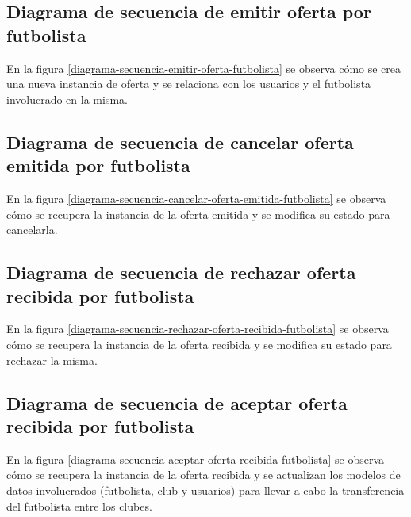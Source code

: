 \subsection*{Diagrama de secuencia de emitir oferta por futbolista}
En la figura \ref{diagrama-secuencia-emitir-oferta-futbolista} se observa cómo
se crea una nueva instancia de oferta y se relaciona con los usuarios y el
futbolista involucrado en la misma.


\subsection*{Diagrama de secuencia de cancelar oferta emitida por futbolista}
En la figura \ref{diagrama-secuencia-cancelar-oferta-emitida-futbolista} se
observa cómo se recupera la instancia de la oferta emitida y se modifica su
estado para cancelarla.


\subsection*{Diagrama de secuencia de rechazar oferta recibida por futbolista}
En la figura \ref{diagrama-secuencia-rechazar-oferta-recibida-futbolista} se
observa cómo se recupera la instancia de la oferta recibida y se modifica su
estado para rechazar la misma.


\newpage

\subsection*{Diagrama de secuencia de aceptar oferta recibida por futbolista}
En la figura \ref{diagrama-secuencia-aceptar-oferta-recibida-futbolista} se
observa cómo se recupera la instancia de la oferta recibida y se actualizan los
modelos de datos involucrados (futbolista, club y usuarios) para llevar a cabo
la transferencia del futbolista entre los clubes.

